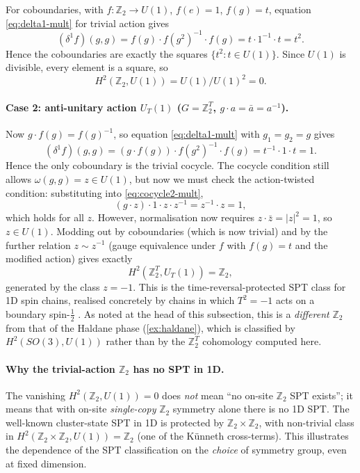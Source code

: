 \documentclass[12pt]{article}
\theoremstyle{plain}
\theoremstyle{definition}
\theoremstyle{remark}
\begin{document}
For coboundaries, with $f:\mathbb{Z}_{2}\to U(1)$, $f(e)=1$, $f(g)=t$, equation
\cref{eq:delta1-mult} for trivial action gives
\[
(\delta^{1}f)(g,g) = f(g)\cdot f(g^{2})^{-1}\cdot f(g) = t\cdot 1^{-1}\cdot t = t^{2}.
\]
Hence the coboundaries are exactly the squares $\{t^{2}:t\in U(1)\}$. Since $U(1)$ is
divisible, every element is a square, so
\[
H^{2}(\mathbb{Z}_{2},U(1)) = U(1)/U(1)^{2} = 0.
\]

\paragraph{Case 2: anti-unitary action $U_{T}(1)$ ($G=\mathbb{Z}_{2}^{T}$, $g\cdot a=
\bar a=a^{-1}$).}
Now $g\cdot f(g)=f(g)^{-1}$, so equation \cref{eq:delta1-mult} with $g_{1}=g_{2}=g$ gives
\[
(\delta^{1}f)(g,g) = (g\cdot f(g))\cdot f(g^{2})^{-1}\cdot f(g) = t^{-1}\cdot 1\cdot t = 1.
\]
Hence the only coboundary is the trivial cocycle. The cocycle condition still allows
$\omega(g,g)=z\in U(1)$, but now we must check the action-twisted condition: substituting
into \cref{eq:cocycle2-mult},
\[
(g\cdot z)\cdot 1\cdot z\cdot z^{-1} = z^{-1}\cdot z = 1,
\]
which holds for all $z$. However, normalisation now requires $z\cdot\bar z = |z|^{2}=1$,
so $z\in U(1)$. Modding out by coboundaries (which is now trivial) and by the further
relation $z\sim z^{-1}$ (gauge equivalence under $f$ with $f(g)=t$ and the modified
action) gives exactly
\[
H^{2}(\mathbb{Z}_{2}^{T},U_{T}(1)) = \mathbb{Z}_{2},
\]
generated by the class $z=-1$. This is the time-reversal-protected SPT class for 1D
spin chains, realised concretely by chains in which $T^{2}=-1$ acts on a boundary
spin-$\tfrac{1}{2}$ \cite{ChenGuLiuWen2013}. As noted at the head of this subsection,
this is a \emph{different} $\mathbb{Z}_{2}$ from that of the Haldane phase
(\cref{ex:haldane}), which is classified by $H^{2}(SO(3),U(1))$ rather than by the
$\mathbb{Z}_{2}^{T}$ cohomology computed here.

\paragraph{Why the trivial-action $\mathbb{Z}_{2}$ has no SPT in 1D.}
The vanishing $H^{2}(\mathbb{Z}_{2},U(1))=0$ does \emph{not} mean ``no on-site
$\mathbb{Z}_{2}$ SPT exists''; it means that with on-site \emph{single-copy}
$\mathbb{Z}_{2}$ symmetry alone there is no 1D SPT. The well-known cluster-state SPT in
1D is protected by $\mathbb{Z}_{2}\times\mathbb{Z}_{2}$, with non-trivial class in
$H^{2}(\mathbb{Z}_{2}\times\mathbb{Z}_{2},U(1))=\mathbb{Z}_{2}$ (one of the K\"unneth
cross-terms). This illustrates the dependence of the SPT classification on the
\emph{choice} of symmetry group, even at fixed dimension.
\end{document}
